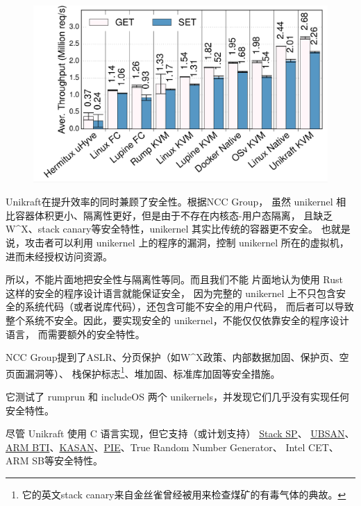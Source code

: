 \documentclass{../runikraft-report}
\begin{document}
\begin{figure}[H]
\begin{minipage}{0.32\linewidth}
\includegraphics[width=1\linewidth]{../assets/Unikraft-throughput.png}
\caption{}
\end{minipage}
\end{figure}

Unikraft在提升效率的同时兼顾了安全性。根据NCC Group\cite{bib:unikernel-secuirty}，
虽然 unikernel 相比容器体积更小、隔离性更好，但是由于不存在内核态-用户态隔离，
且缺乏W\^{}X、stack canary等安全特性，unikernel 其实比传统的容器更不安全。
也就是说，攻击者可以利用 unikernel 上的程序的漏洞，控制 unikernel 所在的虚拟机，
进而未经授权访问资源。

所以，不能片面地把安全性与隔离性等同。而且我们不能
片面地认为使用 Rust 这样的安全的程序设计语言就能保证安全，
因为完整的 unikernel 上不只包含安全的系统代码（或者说库代码），还包含可能不安全的用户代码，
而后者可以导致整个系统不安全。因此，要实现安全的 unikernel，不能仅仅依靠安全的程序设计语言，
而需要额外的安全特性。

NCC Group提到了ASLR、分页保护（如W\^{}X政策、内部数据加固、保护页、空页面漏洞等）、
栈保护标志\footnote{它的英文stack canary来自金丝雀曾经被用来检查煤矿的有毒气体的典故\cite{bib:canary}。}、堆加固、标准库加固等安全措施。

它测试了 rumprun 和 includeOS 两个 unikernels，并发现它们几乎没有实现任何安全特性。

尽管 Unikraft 使用 C 语言实现，但它支持（或计划支持）
\href{https://github.com/unikraft/unikraft/tree/staging/lib/uksp}{Stack SP}、
\href{https://github.com/unikraft/unikraft/tree/staging/lib/ubsan}{UBSAN}、
\href{https://github.com/unikraft/unikraft/pull/421}{ARM BTI}、\href{https://github.com/unikraft/unikraft/pull/191}{KASAN}、\href{https://github.com/unikraft/unikraft/pull/239}{PIE}、True Random Number Generator、
Intel CET、ARM SB等安全特性。\cite{bib:unikraft-secuirty}
\end{document}
